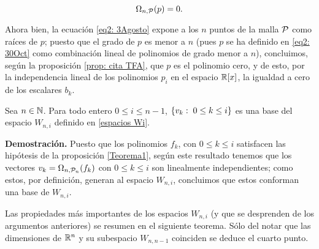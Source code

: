 \begin{equation} \label{eq2: 3Agosto}
\Omega_{n , \mathcal{P}} (p) = 0.
\end{equation}

Ahora bien, 
la ecuación \eqref{eq2: 3Agosto}
expone a los $n$ puntos
de la malla $\mathcal{P}$ como raíces de $p$;  puesto que
el grado de $p$ es menor a $n$
(pues $p$ se ha definido en \eqref{eq2: 30Oct} como
combinación lineal de polinomios de grado menor
a $n$), 
concluimos, según la proposición \ref{prop: cita TFA},
que $p$ es el polinomio cero, 
y de esto, por la
independencia lineal de los polinomios $p_{i}$
en el espacio $\mathbb{R}[x]$, la
igualdad a cero de los escalares $b_{k}$. 
\QEDB
\vspace{0.2cm}

\begin{prop}
Sea $n \in \mathbb{N}$. Para todo entero $0 \leq i \leq n-1$, 
$\{v_{k}: \hspace{0.1cm} 0\leq k \leq i \}$ es una base
del espacio $W_{n,i}$
definido en \eqref{espacios Wi}.
\end{prop}
\noindent
\textbf{Demostración.}
Puesto que los polinomios $f_{k}$, con $0 \leq k \leq i$
satisfacen las hipótesis de la proposición \ref{Teorema1},
según este resultado
tenemos que los vectores $v_{k}= \Omega_{n, \mathcal{P}_{n}}(f_{k})$ 
con $0 \leq k \leq i$
son linealmente independientes; como estos, 
por definición,
generan al espacio $W_{n,i}$, concluimos que 
estos conforman una base de $W_{n,i}$.
\QEDB
\vspace{0.2cm}

Las propiedades más importantes de los
espacios $W_{n,i}$ (y que se desprenden
de los argumentos anteriores) se 
resumen en el siguiente teorema. 
Sólo del notar que las dimensiones de 
$\mathbb{R}^{n}$ y su subespacio $W_{n, n-1}$
coinciden se deduce el cuarto punto.

